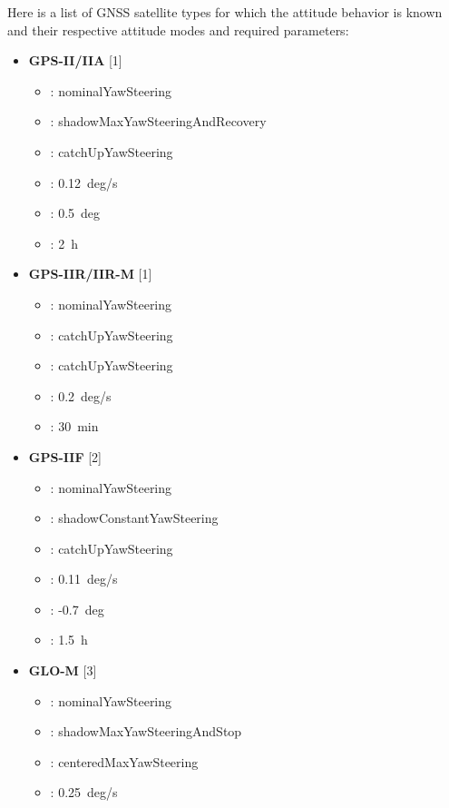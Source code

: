 Here is a list of GNSS satellite types for which the attitude behavior is known and their
respective attitude modes and required parameters:
\begin{itemize}
\item \textbf{GPS-II/IIA} [1]
\begin{itemize}
  \item {}: nominalYawSteering
  \item {}: shadowMaxYawSteeringAndRecovery
  \item {}: catchUpYawSteering
  \item {}: 0.12~deg/s
  \item {}: 0.5~deg
  \item {}: 2~h
\end{itemize}
\item \textbf{GPS-IIR/IIR-M} [1]
\begin{itemize}
  \item {}: nominalYawSteering
  \item {}: catchUpYawSteering
  \item {}: catchUpYawSteering
  \item {}: 0.2~deg/s
  \item {}: 30~min
\end{itemize}
\item \textbf{GPS-IIF} [2]
\begin{itemize}
  \item {}: nominalYawSteering
  \item {}: shadowConstantYawSteering
  \item {}: catchUpYawSteering
  \item {}: 0.11~deg/s
  \item {}: -0.7~deg
  \item {}: 1.5~h
\end{itemize}
\item \textbf{GLO-M} [3]
\begin{itemize}
  \item {}: nominalYawSteering
  \item {}: shadowMaxYawSteeringAndStop
  \item {}: centeredMaxYawSteering
  \item {}: 0.25~deg/s

\end{itemize}
\end{itemize}
